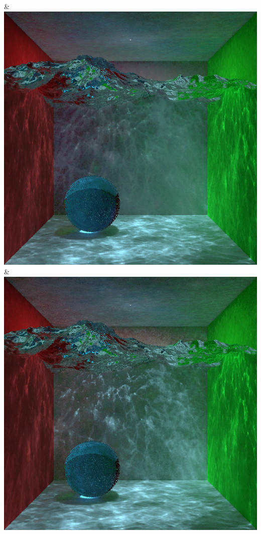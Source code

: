 & \includegraphics[width=\linewidth]{figures/py/tests/sppc_optimization/nrc+sppc16@1_1spp_caustics_small.png}
& \includegraphics[width=\linewidth]{figures/py/tests/sppc_optimization/nrc+sppc16@4_1spp_caustics_small.png}
